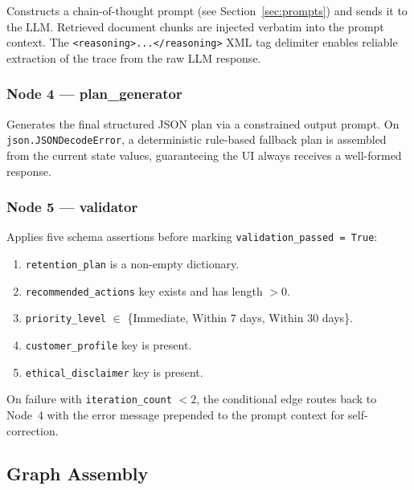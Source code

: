\documentclass[11pt]{article}
\begin{document}
Constructs a chain-of-thought prompt (see Section~\ref{sec:prompts}) and
sends it to the LLM. Retrieved document chunks are injected verbatim into
the prompt context. The \texttt{<reasoning>...</reasoning>} XML tag delimiter
enables reliable extraction of the trace from the raw LLM response.

\subsubsection{Node 4 --- plan\_generator}

Generates the final structured JSON plan via a constrained output prompt.
On \texttt{json.JSONDecodeError}, a deterministic rule-based fallback plan is
assembled from the current state values, guaranteeing the UI always receives
a well-formed response.

\subsubsection{Node 5 --- validator}

Applies five schema assertions before marking \texttt{validation\_passed = True}:

\begin{enumerate}
  \item \texttt{retention\_plan} is a non-empty dictionary.
  \item \texttt{recommended\_actions} key exists and has length $> 0$.
  \item \texttt{priority\_level} $\in$ \{Immediate, Within 7 days, Within 30 days\}.
  \item \texttt{customer\_profile} key is present.
  \item \texttt{ethical\_disclaimer} key is present.
\end{enumerate}

On failure with \texttt{iteration\_count} $< 2$, the conditional edge routes
back to Node~4 with the error message prepended to the prompt context for
self-correction.

\subsection{Graph Assembly}
\end{document}
